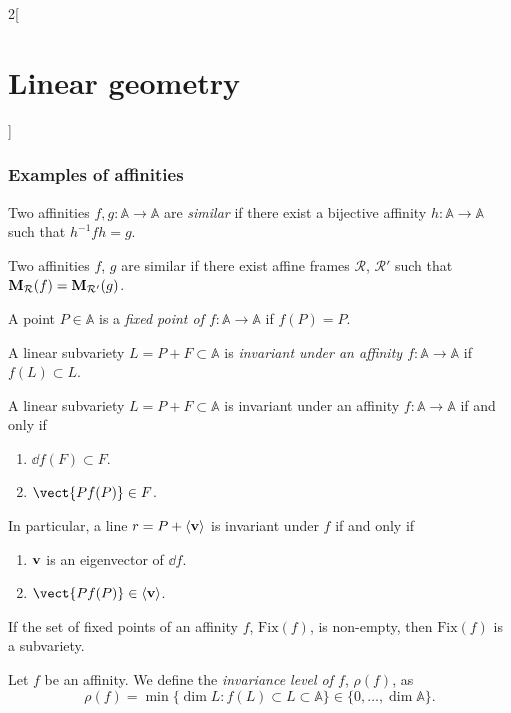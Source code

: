 \documentclass[../../../main.tex]{subfiles}
\begin{document}
\begin{multicols}{2}[\section{Linear geometry}]
    \subsubsection*{Examples of affinities}
    \begin{definition}
        Two affinities $f,g:\mathbb{A}\rightarrow\mathbb{A}$ are \textit{similar} if there exist a bijective affinity $h:\mathbb{A}\rightarrow\mathbb{A}$ such that $h^{-1}fh=g$.
    \end{definition}
    \begin{prop}
        Two affinities $f$, $g$ are similar if there exist affine frames $\mathcal{R}$, $\mathcal{R}'$ such that $\vb{M}_\mathcal{R}(f)=\vb{M}_{\mathcal{R}'}(g)$.
    \end{prop}
    \begin{definition}
        A point $P\in\mathbb{A}$ is a \textit{fixed point of $f:\mathbb{A}\rightarrow\mathbb{A}$} if $f(P)=P$.
    \end{definition}
    \begin{definition}
        A linear subvariety $L=P+F\subset\mathbb{A}$ is \textit{invariant under an affinity $f:\mathbb{A}\rightarrow\mathbb{A}$} if $f(L)\subset L$.
    \end{definition}
    \begin{prop}
        A linear subvariety $L=P+F\subset\mathbb{A}$ is invariant under an affinity $f:\mathbb{A}\rightarrow\mathbb{A}$ if and only if
        \begin{enumerate}
            \item $\dd f(F)\subset F$.
            \item $\vect{Pf(P)}\in F$.
        \end{enumerate} In particular, a line $r=P+\langle\vb{v}\rangle$ is invariant under $f$ if and only if
        \begin{enumerate}
            \item $\vb{v}$ is an eigenvector of $\dd f$.
            \item $\vect{Pf(P)}\in\langle\mathblack{v}\rangle$.
        \end{enumerate}
    \end{prop}
    \begin{prop}
        If the set of fixed points of an affinity $f$, $\text{Fix}(f)$, is non-empty, then $\text{Fix}(f)$ is a subvariety.
    \end{prop}
    \begin{definition}
        Let $f$ be an affinity. We define the \textit{invariance level of $f$}, $\rho(f)$, as $$\rho(f)=\min\{\dim L:f(L)\subset L\subset\mathbb{A}\}\in\{0,\ldots,\dim\mathbb{A}\}.$$

\end{definition}
\end{multicols}
\end{document}
